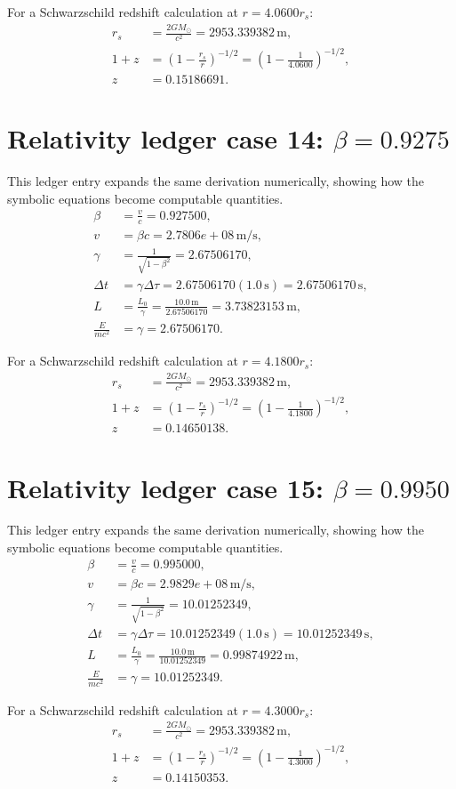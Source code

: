 \documentclass[11pt,a4paper]{article}
\begin{document}
For a Schwarzschild redshift calculation at $r=4.0600r_s$:
\begin{align}
r_s &= \frac{2GM_\odot}{c^2}=2953.339382\,\mathrm{m},\\
1+z &= \left(1-\frac{r_s}{r}\right)^{-1/2}
=\left(1-\frac{1}{4.0600}\right)^{-1/2},\\
z&=0.15186691.
\end{align}

\section{Relativity ledger case 14: $\beta=0.9275$}
This ledger entry expands the same derivation numerically, showing how the symbolic equations become computable quantities.
\begin{align}
\beta &= \frac{v}{c}=0.927500,\\
v &= \beta c = 2.7806e+08\,\mathrm{m/s},\\
\gamma &= \frac{1}{\sqrt{1-\beta^2}} = 2.67506170,\\
\Delta t &= \gamma\Delta\tau = 2.67506170(1.0\,\mathrm{s}) = 2.67506170\,\mathrm{s},\\
L &= \frac{L_0}{\gamma} = \frac{10.0\,\mathrm{m}}{2.67506170} = 3.73823153\,\mathrm{m},\\
\frac{E}{mc^2}&=\gamma=2.67506170.
\end{align}

For a Schwarzschild redshift calculation at $r=4.1800r_s$:
\begin{align}
r_s &= \frac{2GM_\odot}{c^2}=2953.339382\,\mathrm{m},\\
1+z &= \left(1-\frac{r_s}{r}\right)^{-1/2}
=\left(1-\frac{1}{4.1800}\right)^{-1/2},\\
z&=0.14650138.
\end{align}

\newpage

\section{Relativity ledger case 15: $\beta=0.9950$}
This ledger entry expands the same derivation numerically, showing how the symbolic equations become computable quantities.
\begin{align}
\beta &= \frac{v}{c}=0.995000,\\
v &= \beta c = 2.9829e+08\,\mathrm{m/s},\\
\gamma &= \frac{1}{\sqrt{1-\beta^2}} = 10.01252349,\\
\Delta t &= \gamma\Delta\tau = 10.01252349(1.0\,\mathrm{s}) = 10.01252349\,\mathrm{s},\\
L &= \frac{L_0}{\gamma} = \frac{10.0\,\mathrm{m}}{10.01252349} = 0.99874922\,\mathrm{m},\\
\frac{E}{mc^2}&=\gamma=10.01252349.
\end{align}

For a Schwarzschild redshift calculation at $r=4.3000r_s$:
\begin{align}
r_s &= \frac{2GM_\odot}{c^2}=2953.339382\,\mathrm{m},\\
1+z &= \left(1-\frac{r_s}{r}\right)^{-1/2}
=\left(1-\frac{1}{4.3000}\right)^{-1/2},\\
z&=0.14150353.
\end{align}
\end{document}
